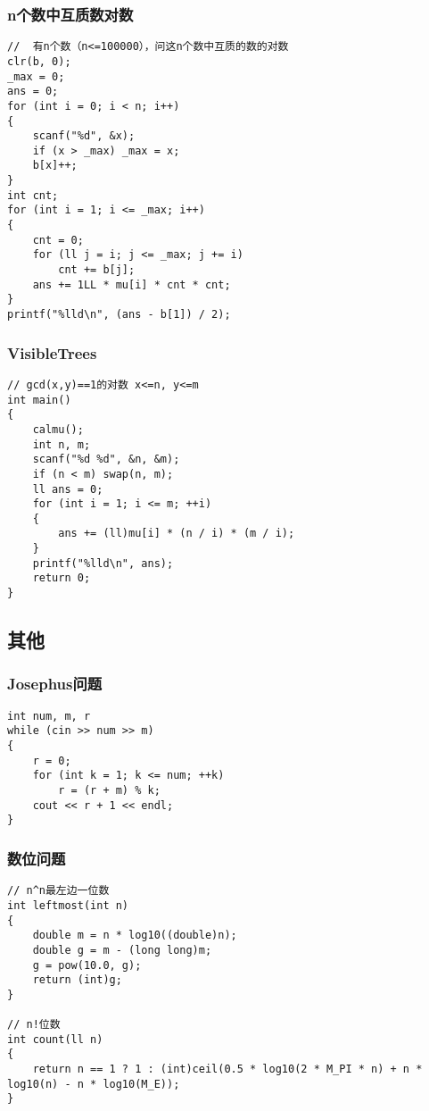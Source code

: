 \documentclass[a4]{article}
\begin{document}
\subsubsection{n个数中互质数对数}
\begin{lstlisting}
//  有n个数（n<=100000），问这n个数中互质的数的对数
clr(b, 0);
_max = 0;
ans = 0;
for (int i = 0; i < n; i++)
{
    scanf("%d", &x);
    if (x > _max) _max = x;
    b[x]++;
}
int cnt;
for (int i = 1; i <= _max; i++)
{
    cnt = 0;
    for (ll j = i; j <= _max; j += i)
        cnt += b[j];
    ans += 1LL * mu[i] * cnt * cnt;
}
printf("%lld\n", (ans - b[1]) / 2);
\end{lstlisting}
\subsubsection{VisibleTrees}
\begin{lstlisting}
// gcd(x,y)==1的对数 x<=n, y<=m
int main()
{
    calmu();
    int n, m;
    scanf("%d %d", &n, &m);
    if (n < m) swap(n, m);
    ll ans = 0;
    for (int i = 1; i <= m; ++i)
    {
        ans += (ll)mu[i] * (n / i) * (m / i);
    }
    printf("%lld\n", ans);
    return 0;
}
\end{lstlisting}
\subsection{其他}
\subsubsection{Josephus问题}
\begin{lstlisting}
int num, m, r
while (cin >> num >> m)
{
    r = 0;
    for (int k = 1; k <= num; ++k)
        r = (r + m) % k;
    cout << r + 1 << endl;
}
\end{lstlisting}
\subsubsection{数位问题}
\begin{lstlisting}
// n^n最左边一位数
int leftmost(int n)
{
    double m = n * log10((double)n);
    double g = m - (long long)m;
    g = pow(10.0, g);
    return (int)g;
}

// n!位数
int count(ll n)
{
    return n == 1 ? 1 : (int)ceil(0.5 * log10(2 * M_PI * n) + n * log10(n) - n * log10(M_E));
}
\end{lstlisting}
\end{document}
